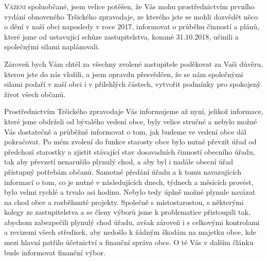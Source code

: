 \documentclass{article}
\begin{document}
\begin{multicols}{3}{

\lettrine{V}{ážení} spoluobčané, jsem velice potěšen, že Vás mohu prostřednictvím prvního vydání obnoveného Tršického zpravodaje, ze kterého jste se mohli dozvědět něco o dění v naší obci naposledy v roce 2017, informovat o průběhu činností a plánů, které jsme od ustavující schůze zastupitelstva, konané 31.10.2018, učinili a společnými silami naplánovali.

Zároveň bych Vám chtěl za všechny zvolené zastupitele poděkovat za Vaši důvěru, kterou jste do nás vložili, a jsem opravdu přesvědčen, že se nám společnými silami podaří v naší obci i v přilehlých částech, vytvořit podmínky pro spokojený život všech občanů.

Prostřednictvím Tršického zpravodaje Vás informujeme až nyní, jelikož informace, které jsme obdrželi od bývalého vedení obce, byly velice stručné a nebylo možné Vás dostatečně a průběžně informovat o tom, jak budeme ve vedení obce dál pokračovat. Po mém zvolení do funkce starosty obce bylo nutné převzít úřad od předchozí starostky a zjistit stávající stav dosavadních činností obecního úřadu, tak aby převzetí nenarušilo plynulý chod, a aby byl i nadále obecní úřad přístupný potřebám občanů. Samotné předání úřadu a k tomu navazujících informací o tom, co je nutné v následujících dnech, týdnech a měsících provést, bylo velmi rychlé a trvalo asi hodinu. Nebylo tedy úplně možné plynule navázat na chod obce a rozběhnuté projekty. Společně s místostarostou, s některými kolegy ze zastupitelstva a se členy výborů jsme k problematice přistoupili tak, abychom zabezpečili plynulý chod úřadu, avšak zároveň i s celkovými kontrolami a revizemi všech středisek, aby nedošlo k žádným škodám na majetku obce, kde mezi hlavní patřilo účetnictví a finanční správa obce. O té Vás v dalším článku bude informovat finanční výbor.

}
\end{multicols}
\end{document}
